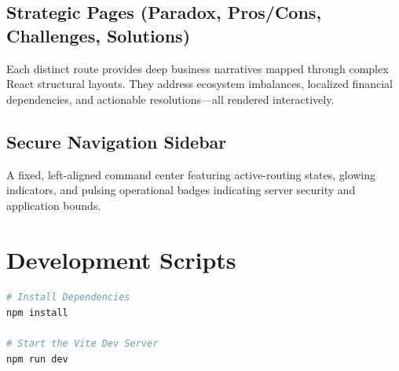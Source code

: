 \documentclass[12pt,a4paper]{article}
\begin{document}
\subsection{Strategic Pages (Paradox, Pros/Cons, Challenges, Solutions)}
Each distinct route provides deep business narratives mapped through complex React structural layouts. They address ecosystem imbalances, localized financial dependencies, and actionable resolutions—all rendered interactively.

\subsection{Secure Navigation Sidebar}
A fixed, left-aligned command center featuring active-routing states, glowing indicators, and pulsing operational badges indicating server security and application bounds.

\section{Development Scripts}
\begin{lstlisting}[language=bash, title=Starting the Development Server]
# Install Dependencies
npm install

# Start the Vite Dev Server
npm run dev
\end{lstlisting}
\end{document}
